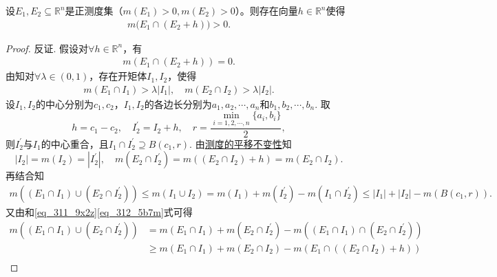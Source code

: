 \documentclass[../../main.tex]{subfiles}%
\begin{document}
\begin{example}
设$E_1,E_2\subseteq \mathbb{R}^n$是正测度集（$m(E_1)>0,m(E_2)>0$）。则存在向量$h\in \mathbb{R}^n$使得
\begin{align*}
m\bigl(E_1\cap (E_2+h)\bigr) > 0.
\end{align*}
\end{example}
\begin{proof}

反证. 假设对$\forall h\in \mathbb{R}^n$，有
\begin{align}\label{eq_311_9x2z}
m\left( E_1\cap \left( E_2+h \right) \right) =0.
\end{align}
由知对$\forall \lambda \in \left( 0,1 \right)$，存在开矩体$I_1,I_2$，使得
\begin{align}\label{eq_312_5b7m}
m\left( E_1\cap I_1 \right) >\lambda \left| I_1 \right|,\quad m\left( E_2\cap I_2 \right) >\lambda \left| I_2 \right|.
\end{align}
设$I_1,I_2$的中心分别为$c_1,c_2$，$I_1,I_2$的各边长分别为$a_1,a_2,\cdots ,a_n$和$b_1,b_2,\cdots ,b_n$. 取
$$h=c_1-c_2,\quad I_{2}^{\prime}=I_2+h,\quad r=\frac{\min\limits_{i=1,2,\cdots ,n}\{a_i,b_i\}}{2},$$
则$I_{2}^{\prime}$与$I_1$的中心重合，且$I_1\cap I_{2}^{\prime}\supseteq B\left( c_1,r \right)$. 由\hyperref[theorem:外测度的平移不变性]{测度的平移不变性}知
$$\left| I_2 \right|=m\left( I_2 \right) =\left| I_{2}^{\prime} \right|,\quad m\left( E_2\cap I_{2}^{\prime} \right) =m\left( \left( E_2\cap I_2 \right) +h \right) =m\left( E_2\cap I_2 \right).$$
再结合知
\begin{align}\label{eq_313_4d8s}
m\left( \left( E_1\cap I_1 \right) \cup \left( E_2\cap I_{2}^{\prime} \right) \right)
\leqslant m\left( I_1\cup I_2 \right)
= m\left( I_1 \right) +m\left( I_{2}^{\prime} \right) -m\left( I_1\cap I_{2}^{\prime} \right)
\leqslant \left| I_1 \right|+\left| I_2 \right|-m\left( B\left( c_1,r \right) \right).
\end{align}
又由和\eqref{eq_311_9x2z}\eqref{eq_312_5b7m}式可得
\begin{align}\label{eq_314_6f9g}
m\left( \left( E_1\cap I_1 \right) \cup \left( E_2\cap I_{2}^{\prime} \right) \right)
&= m\left( E_1\cap I_1 \right) +m\left( E_2\cap I_{2}^{\prime} \right) -m\left( \left( E_1\cap I_1 \right) \cap \left( E_2\cap I_{2}^{\prime} \right) \right) \nonumber\\
&\geqslant m\left( E_1\cap I_1 \right) +m\left( E_2\cap I_2 \right) -m\left( E_1\cap \left( \left( E_2\cap I_2 \right) +h \right) \right) \nonumber\\

\end{align}
\end{proof}
\end{document}
